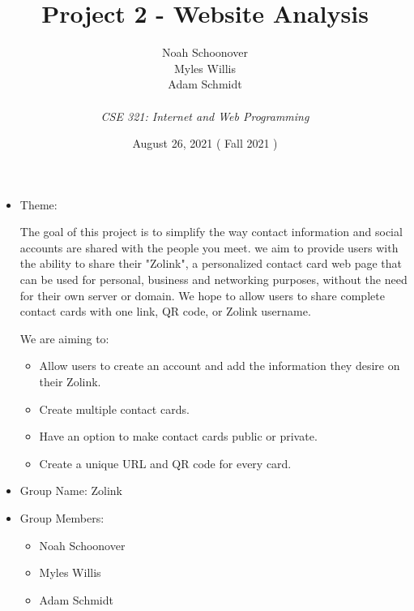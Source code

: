 \documentclass[12pt]{article}%
\def\assignmentName { Project 2 - Website Analysis                      }
\def\className      { CSE 321: Internet and Web Programming             }
\def\studentName    { Noah Schoonover \\ Myles Willis \\ Adam Schmidt   }
\def\studentEmail   {  }
\def\dueDate        { August 26, 2021                                   }
\def\semesterDate   { Fall 2021                                         }
\begin{document}


\begin{singlespace}
\title{ \assignmentName }
\author{ \studentName \\ {\small \studentEmail} \\ {\it \className}}
\date{\dueDate (\semesterDate)}
\maketitle
\end{singlespace}



\begin{itemize}
    \item Theme: 
    
    The goal of this project is to simplify the way contact information and social accounts are shared with the people you meet. 
    we aim to provide users with the ability to share their "Zolink", a personalized contact card web page that can be used for personal, 
    business and networking purposes, without the need for their own server or domain. We hope to allow users to share complete 
    contact cards with one link, QR code, or Zolink username.
    
    We are aiming to:
    \begin{itemize}
    	\item Allow users to create an account and add the information they desire on their Zolink.
    	\item Create multiple contact cards.
    	\item Have an option to make contact cards public or private.
    	\item Create a unique URL and QR code for every card.
    \end{itemize}
    
    \item Group Name: Zolink
    \item Group Members:
    \begin{itemize}
    	\item Noah Schoonover
    	\item Myles Willis
    	\item Adam Schmidt
    \end{itemize}
\end{itemize}
\end{document}
